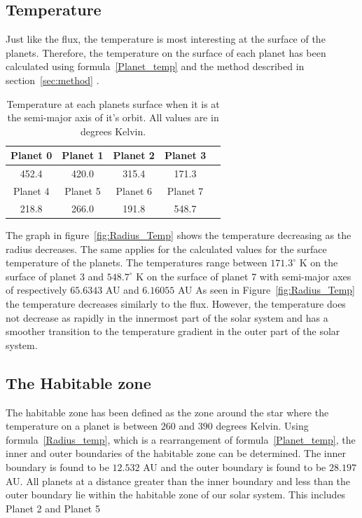 \documentclass[reprint,english,notitlepage]{revtex4-2}
\begin{document}
\subsection{Temperature}\label{subsec:temperature-results}
	Just like the flux, the temperature is most interesting at the surface of the planets.
	Therefore, the temperature on the surface of each planet has been calculated using formula~\eqref{Planet_temp} and the method described in section~\ref{sec:method} .

	\begin{table}[h]
			\begin{tabular}{|c|c|c|c|c|}
				\hline
				Planet 0 & Planet 1 & Planet 2 & Planet 3\\
				\hline
				452.4 & 420.0 & 315.4 & 171.3\\
				\hline\hline
				Planet 4 & Planet 5 & Planet 6 & Planet 7\\
				\hline
				218.8 & 266.0 & 191.8 & 548.7\\
				\hline
			\end{tabular}
			\caption{Temperature at each planets surface when it is at the semi-major axis of it's orbit. All values are in degrees Kelvin.}
			\label{tab:planet_temp}
		\end{table}

	The graph in figure~\ref{fig:Radius_Temp} shows the temperature decreasing as the radius decreases.
	The same applies for the calculated values for the surface temperature of the planets.
	The temperatures range between $171.3^{\circ}$ K on the surface of planet 3 and $548.7^{\circ}$ K on the surface of planet 7 with semi-major axes of respectively $65.6343$ AU and $6.16055$ AU
	As seen in Figure~\ref{fig:Radius_Temp} the temperature decreases similarly to the flux.
	However, the temperature does not decrease as rapidly in the innermost part of the solar system and has a smoother transition to the temperature gradient in the outer part of the solar system.\\


\subsection{The Habitable zone}\label{subsec:the-habitable-zone-results}
	The habitable zone has been defined as the zone around the star where the temperature on a planet is between $260$ and $390$ degrees Kelvin.
	Using formula~\eqref{Radius_temp}, which is a rearrangement of formula~\ref{Planet_temp}, the inner and outer boundaries of the habitable zone can be determined.
	The inner boundary is found to be $12.532$ AU and the outer boundary is found to be $28.197$ AU.
	All planets at a distance greater than the inner boundary and less than the outer boundary lie within the habitable zone of our solar system.
	This includes Planet 2 and Planet 5\\
\end{document}
